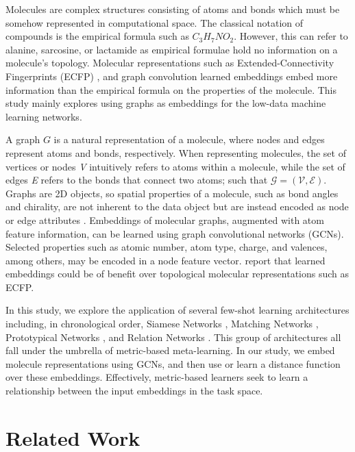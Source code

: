 Molecules are complex structures consisting of atoms and bonds which must be somehow represented in computational space. The classical notation of compounds is the empirical formula such as $C_3H_7NO_2$. However, this can refer to alanine, sarcosine, or lactamide as empirical formulae hold no information on a molecule's topology. Molecular representations such as Extended-Connectivity Fingerprints (ECFP) \cite{rogers2010extended}, and graph convolution learned embeddings \cite{duvenaud2015convolutional} embed more information than the empirical formula on the properties of the molecule. This study mainly explores using graphs as embeddings for the low-data machine learning networks.

A graph $G$ is a natural representation of a molecule, where nodes and edges represent atoms and bonds, respectively. When representing molecules, the set of vertices or nodes \textit{V} intuitively refers to atoms within a molecule, while the set of edges \textit{E} refers to the bonds that connect two atoms; such that $\mathcal{G}=(\mathcal{V}, \mathcal{E})$. Graphs are 2D objects, so spatial properties of a molecule, such as bond angles and chirality, are not inherent to the data object but are instead encoded as node or edge attributes \cite{david2020molecular}. Embeddings of molecular graphs, augmented with atom feature information, can be learned using graph convolutional networks (GCNs). Selected properties such as atomic number, atom type, charge, and valences, among others, may be encoded in a node feature vector. \citet{wu2018moleculenet} report that learned embeddings could be of benefit over topological molecular representations such as ECFP.

In this study, we explore the application of several few-shot learning architectures including, in chronological order, Siamese Networks \citep{koch2015siamese}, Matching Networks \citep{vinyals2016matching}, Prototypical Networks \citep{snell2017prototypical}, and Relation Networks \citep{sung2018learning}. This group of architectures all fall under the umbrella of metric-based meta-learning. In our study, we embed molecule representations using GCNs, and then use or learn a distance function over these embeddings. Effectively, metric-based learners seek to learn a relationship between the input embeddings in the task space. 

\section{Related Work}

